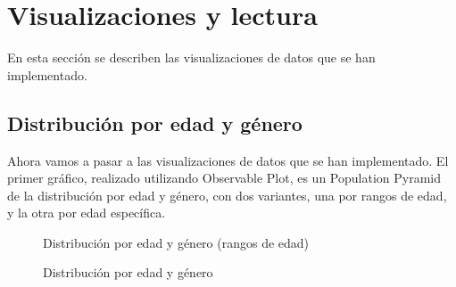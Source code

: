 \section{Visualizaciones y lectura}

En esta sección se describen las visualizaciones de datos que se han implementado.

\subsection{Distribución por edad y género}
Ahora vamos a pasar a las visualizaciones de datos que se han implementado. El primer gráfico, realizado utilizando Observable Plot, es un Population Pyramid \cite{populationPyramid} de la distribución por edad y género, con dos variantes, una por rangos de edad, y la otra por edad específica.
\begin{figure}[H]
  \centering
  \caption{Distribución por edad y género (rangos de edad)}
  \label{fig:chart2}
\end{figure}
\begin{figure}[H]
  \centering
  \caption{Distribución por edad y género}
  \label{fig:chart3}
\end{figure}

